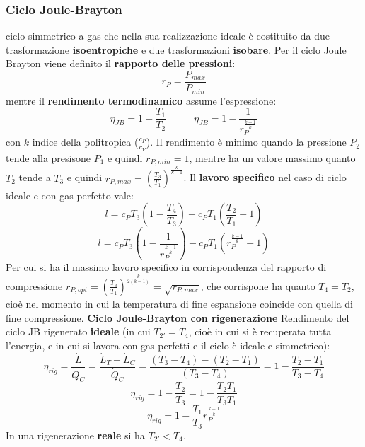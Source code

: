 \subsubsection{Ciclo Joule-Brayton}
ciclo simmetrico a gas che nella sua realizzazione ideale è costituito da
due trasformazione \textbf{isoentropiche} e due trasformazioni \textbf{isobare}.\newline
\newline
Per il ciclo Joule Brayton viene definito il \textbf{rapporto delle pressioni}:
\[
    r_P = \frac{P_{max}}{P_{min}}
\]
mentre il \textbf{rendimento termodinamico} assume l'espressione:
\[
    \eta_{JB} = 1- \frac{T_1}{T_2} \;\;\;\;\;\;\;\;\;\;\eta_{JB} = 1- \frac{1}{r_P^{\frac{k-1}{k}}}
\]
con $k$ indice della politropica ($\frac{c_P}{c_V}$).\newline
Il rendimento è minimo quando la pressione $P_2$ tende alla presisone $P_1$ e quindi $r_{P,min} = 1$, mentre ha un valore massimo quanto $T_2$ tende a $T_3$ e quindi $r_{P,max} = \left(\frac{T_3}{T_1}\right)^{\frac{k}{k-1}}$.\newline
\newline
Il \textbf{lavoro specifico} nel caso di ciclo ideale e con gas perfetto vale:
\[
    l = c_P T_3 \left(1- \frac{T_4}{T_3}\right) - c_P T_1 \left(\frac{T_2}{T_1} - 1\right)
\]
\[
    l = c_P T_3 \left(1- \frac{1}{r_P^{\frac{k-1}{k}}}\right) - c_P T_1 \left(r_P^{\frac{k-1}{k}}-1\right)
\]
Per cui si ha il massimo lavoro specifico in corrispondenza del rapporto di compressione $r_{P,opt} = \left(\frac{T_3}{T_1}\right)^{\frac{k}{2(k-1)}} = \sqrt{r_{P,max}}$, che corrispone ha quanto $T_4 = T_2$, cioè nel momento in cui la temperatura di fine espansione coincide con quella di fine compressione.\newline
\newline
\newline
\newline
\textbf{Ciclo Joule-Brayton con rigenerazione}\newline
Rendimento del ciclo JB rigenerato \textbf{ideale} (in cui $T_{2'} = T_4$, cioè in cui si è recuperata tutta l'energia, e in cui si lavora con gas perfetti e il ciclo è ideale e simmetrico):
\[
    \eta_{rig} = \frac{\dot{L}}{\dot{Q}_C} = \frac{\dot{L}_T - \dot{L}_C}{\dot{Q}_C} = \frac{(T_3-T_4)-(T_2-T_1)}{(T_3-T_4)} = 1- \frac{T_2-T_1}{T_3-T_4}
\]
\[
    \eta_{rig} = 1- \frac{T_2}{T_3} = 1- \frac{T_2 T_1}{T_3T_1}
\]
\[
    \eta_{rig} = 1- \frac{T_1}{T_3}r_P^{\frac{k-1}{k}}
\]
In una rigenerazione \textbf{reale} si ha $T_{2'}< T_4$.
